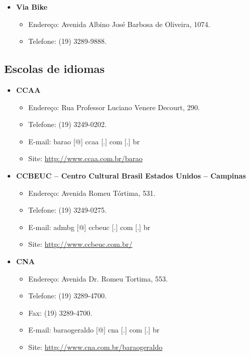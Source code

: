 \begin{itemize}
\item  \textbf{Via Bike}
\begin{itemize}
\item  Endereço: Avenida Albino José Barbosa de Oliveira, 1074.
\item  Telefone: (19) 3289-9888.
\end{itemize}
\end{itemize}

\subsection{Escolas de idiomas}

\begin{itemize}
\item  \textbf{CCAA}
\begin{itemize}
\item  Endereço: Rua Professor Luciano Venere Decourt, 290.
\item  Telefone: (19) 3249-0202.
\item  E-mail: barao [@] ccaa [.] com [.] br
\item  Site: \url{http://www.ccaa.com.br/barao}
\end{itemize}
\end{itemize}

\begin{itemize}
\item  \textbf{CCBEUC -- Centro Cultural Brasil Estados Unidos -- Campinas}
\begin{itemize}
\item  Endereço: Avenida Romeu Tórtima, 531.
\item  Telefone: (19) 3249-0275.
\item  E-mail: admbg [@] ccbeuc [.] com [.] br
\item  Site: \url{http://www.ccbeuc.com.br/}
\end{itemize}
\end{itemize}

\begin{itemize}
\item  \textbf{CNA}
\begin{itemize}
\item  Endereço: Avenida Dr. Romeu Tortima, 553.
\item  Telefone: (19) 3289-4700.
\item  Fax: (19) 3289-4700.
\item  E-mail: baraogeraldo [@] cna [.] com [.] br
\item  Site: \url{http://www.cna.com.br/baraogeraldo}
\end{itemize}
\end{itemize}

